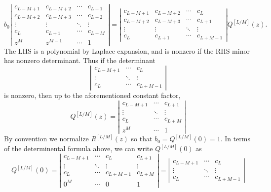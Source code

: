\[
  b_0
  \left|
  \begin{matrix}
    c_{L-M+1} & c_{L-M+2} & \cdots & c_{L+1} \\
    c_{L-M+2} & c_{L-M+3} & \cdots & c_{L+2} \\
    \vdots & \vdots & \ddots & \vdots \\
    c_{L} & c_{L+1} & \cdots & c_{L+M} \\
    z^M & z^{M-1} & \cdots & 1
  \end{matrix}
  \right|
  =
  \left|
  \begin{matrix}
    c_{L-M+1} & c_{L-M+2} & \cdots & c_L \\
    c_{L-M+2} & c_{L-M+3} & \cdots & c_{L+1} \\
    \vdots & \vdots & \ddots & \vdots  \\
    c_L & c_{L+1} & \cdots & c_{L+M-1} 
  \end{matrix}
  \right| 
  Q^{[L/M]}(z).
\]
The LHS is a polynomial by Laplace expansion, and is nonzero if the RHS minor has nonzero determinant. Thus if the determinant
\[
  \left|
  \begin{matrix}
    c_{L-M+1} & \cdots & c_L \\
    \vdots & \ddots & \vdots  \\
    c_L & \cdots & c_{L+M-1} 
  \end{matrix}
  \right| 
\]
is nonzero, then up to the aforementioned constant factor,
\begin{equation}
  Q^{[L/M]}(z) = 
  \left|
  \begin{matrix}
    c_{L-M+1} & \cdots & c_{L+1} \\
    \vdots & \ddots & \vdots \\
    c_{L} & \cdots & c_{L+M} \\
    z^M & \cdots & 1
  \end{matrix}
  \right| 
  \label{eq:Qdet}
\end{equation}
By convention we normalize $R^{[L/M]}(z)$ so that $b_0 = Q^{[L/M]}(0) = 1$. In terms of the determinental formula above, we can write $Q^{[L/M]}(0)$ as
\[
  Q^{[L/M]}(0) = 
  \left|
  \begin{matrix}
    c_{L-M+1} & \cdots & c_{L} & c_{L+1} \\
    \vdots & \ddots & \vdots & \vdots \\
    c_{L} & \cdots & c_{L+M-1} & c_{L+M} \\
    0^M & \cdots & 0 & 1
  \end{matrix}
  \right|
  =
  \left|
  \begin{matrix}
    c_{L-M+1} & \cdots & c_{L}  \\
    \vdots & \ddots & \vdots  \\
    c_{L} & \cdots & c_{L+M-1}
  \end{matrix}
  \right|
\]
